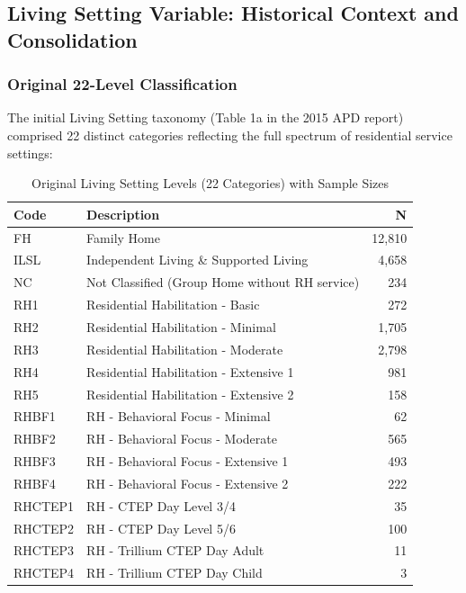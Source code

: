 \subsection{Living Setting Variable: Historical Context and Consolidation}

\subsubsection{Original 22-Level Classification}

The initial Living Setting taxonomy (Table 1a in the 2015 APD report) comprised 22 distinct categories reflecting the full spectrum of residential service settings:

\begin{table}[htbp]
\centering
\caption{Original Living Setting Levels (22 Categories) with Sample Sizes}
\small
\begin{tabular}{|l|p{7cm}|r|}
\hline
\textbf{Code} & \textbf{Description} & \textbf{N} \\
\hline
FH & Family Home & 12,810 \\
\hline
ILSL & Independent Living \& Supported Living & 4,658 \\
\hline
NC & Not Classified (Group Home without RH service) & 234 \\
\hline
RH1 & Residential Habilitation - Basic & 272 \\
\hline
RH2 & Residential Habilitation - Minimal & 1,705 \\
\hline
RH3 & Residential Habilitation - Moderate & 2,798 \\
\hline
RH4 & Residential Habilitation - Extensive 1 & 981 \\
\hline
RH5 & Residential Habilitation - Extensive 2 & 158 \\
\hline
RHBF1 & RH - Behavioral Focus - Minimal & 62 \\
\hline
RHBF2 & RH - Behavioral Focus - Moderate & 565 \\
\hline
RHBF3 & RH - Behavioral Focus - Extensive 1 & 493 \\
\hline
RHBF4 & RH - Behavioral Focus - Extensive 2 & 222 \\
\hline
RHCTEP1 & RH - CTEP Day Level 3/4 & 35 \\
\hline
RHCTEP2 & RH - CTEP Day Level 5/6 & 100 \\
\hline
RHCTEP3 & RH - Trillium CTEP Day Adult & 11 \\
\hline
RHCTEP4 & RH - Trillium CTEP Day Child & 3 \\
\hline

\end{tabular}
\end{table}
